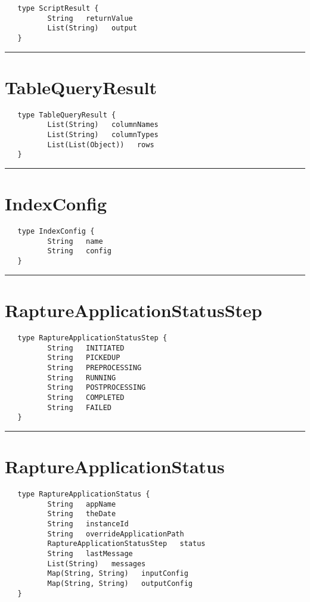 \begin{Verbatim}
   type ScriptResult {
          String   returnValue
          List(String)   output
   }
\end{Verbatim}

\rule{12cm}{2pt}
\section{TableQueryResult}
\label{type:TableQueryResult}

\begin{Verbatim}
   type TableQueryResult {
          List(String)   columnNames
          List(String)   columnTypes
          List(List(Object))   rows
   }
\end{Verbatim}

\rule{12cm}{2pt}
\section{IndexConfig}
\label{type:IndexConfig}

\begin{Verbatim}
   type IndexConfig {
          String   name
          String   config
   }
\end{Verbatim}

\rule{12cm}{2pt}
\section{RaptureApplicationStatusStep}
\label{type:RaptureApplicationStatusStep}

\begin{Verbatim}
   type RaptureApplicationStatusStep {
          String   INITIATED
          String   PICKEDUP
          String   PREPROCESSING
          String   RUNNING
          String   POSTPROCESSING
          String   COMPLETED
          String   FAILED
   }
\end{Verbatim}

\rule{12cm}{2pt}
\section{RaptureApplicationStatus}
\label{type:RaptureApplicationStatus}

\begin{Verbatim}
   type RaptureApplicationStatus {
          String   appName
          String   theDate
          String   instanceId
          String   overrideApplicationPath
          RaptureApplicationStatusStep   status
          String   lastMessage
          List(String)   messages
          Map(String, String)   inputConfig
          Map(String, String)   outputConfig
   }
\end{Verbatim}

